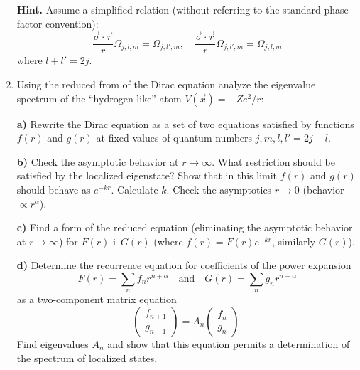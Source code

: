 \documentclass[a4paper,11pt]{article}
\begin{document}
\begin{enumerate}
  \textbf{Hint.} Assume a simplified relation (without referring to
  the standard phase factor convention):
  \begin{equation}
    \label{QM:24}
    \frac{ \vec{ \sigma } \cdot \vec{ r } }{ r } \Omega_{ j, l, m }
    = \Omega_{ j, l', m }, \quad
    \frac{ \vec{ \sigma } \cdot \vec{ r } }{ r } \Omega_{ j, l', m }
    = \Omega_{ j, l, m }
  \end{equation}
  where $l + l' = 2 j$.

\item Using the reduced from of the Dirac equation analyze the
  eigenvalue spectrum of the ``hydrogen-like'' atom
  $V( \vec{ x } ) = -Z e^{ 2 } / r$:

  \textbf{a)} Rewrite the Dirac equation as a set of two equations
  satisfied by functions $f( r )$ and $g( r )$ at fixed values of
  quantum numbers $j, m, l, l' = 2j - l$.

  \textbf{b)} Check the asymptotic behavior at $r \to \infty$. What
  restriction should be satisfied by the localized eigenstate? Show
  that in this limit $f( r )$ and $g( r )$ should behave as
  $e^{ -kr }$. Calculate $k$. Check the asymptotics $r \to 0$
  (behavior $\varpropto r^{ \alpha }$).

  \textbf{c)} Find a form of the reduced equation (eliminating the
  asymptotic behavior at $r \to \infty$) for $F( r )$ i~$G( r )$
  (where $f( r ) = F( r ) e^{ -kr }$, similarly $G( r )$).

  \textbf{d)} Determine the recurrence equation for coefficients of
  the power expansion
  \begin{equation}
    \label{QM:24}
    F( r ) = \sum_{ n } f_{ n } r^{ n + \alpha } \quad \textrm{and} \quad
    G( r ) = \sum_{ n } g_{ n } r^{ n + \alpha }
  \end{equation}
  as a two-component matrix equation
  \begin{equation}
    \label{QM:25}
    \begin{pmatrix}
      f_{ n + 1 } \\
      g_{ n + 1 }
    \end{pmatrix}
    =
    A_{ n }
    \begin{pmatrix}
      f_{ n } \\
      g_{ n }
    \end{pmatrix}.
  \end{equation}
  Find eigenvalues $A_{ n }$ and show that this equation permits a
  determination of the spectrum of localized states.


\end{enumerate}
\end{document}
